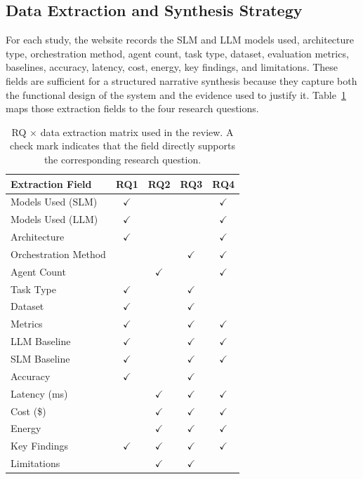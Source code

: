 \subsection{Data Extraction and Synthesis Strategy}
For each study, the website records the SLM and LLM models used, architecture type, orchestration method, agent count, task type, dataset, evaluation metrics, baselines, accuracy, latency, cost, energy, key findings, and limitations. These fields are sufficient for a structured narrative synthesis because they capture both the functional design of the system and the evidence used to justify it. Table~\ref{tab:rq-matrix} maps those extraction fields to the four research questions.

\begin{table}[t]
\caption{RQ $\times$ data extraction matrix used in the review. A check mark indicates that the field directly supports the corresponding research question.}
\label{tab:rq-matrix}
\centering
\scriptsize
\begin{tabularx}{\textwidth}{@{}>{\raggedright\arraybackslash}Xcccc@{}}
\toprule
\textbf{Extraction Field} & \textbf{RQ1} & \textbf{RQ2} & \textbf{RQ3} & \textbf{RQ4} \\
\midrule
Models Used (SLM) & $\checkmark$ &  &  & $\checkmark$ \\
Models Used (LLM) & $\checkmark$ &  &  & $\checkmark$ \\
Architecture & $\checkmark$ &  &  & $\checkmark$ \\
Orchestration Method &  &  & $\checkmark$ & $\checkmark$ \\
Agent Count &  & $\checkmark$ &  & $\checkmark$ \\
Task Type & $\checkmark$ &  & $\checkmark$ &  \\
Dataset & $\checkmark$ &  & $\checkmark$ &  \\
Metrics & $\checkmark$ &  & $\checkmark$ & $\checkmark$ \\
LLM Baseline & $\checkmark$ &  & $\checkmark$ & $\checkmark$ \\
SLM Baseline & $\checkmark$ &  & $\checkmark$ & $\checkmark$ \\
Accuracy & $\checkmark$ &  & $\checkmark$ &  \\
Latency (ms) &  & $\checkmark$ & $\checkmark$ & $\checkmark$ \\
Cost (\$) &  & $\checkmark$ & $\checkmark$ & $\checkmark$ \\
Energy &  & $\checkmark$ & $\checkmark$ & $\checkmark$ \\
Key Findings & $\checkmark$ & $\checkmark$ & $\checkmark$ & $\checkmark$ \\
Limitations &  & $\checkmark$ & $\checkmark$ &  \\
\bottomrule
\end{tabularx}
\end{table}

